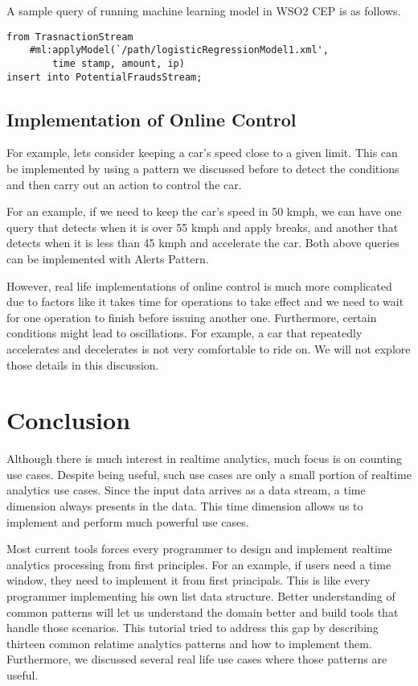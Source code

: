 \documentclass{sig-alternate}
\begin{document}
{A sample query of running machine learning model in WSO2 CEP is as follows.


\begin{lstlisting}[mathescape, showstringspaces=false]
from TrasnactionStream
	#ml:applyModel(`/path/logisticRegressionModel1.xml',  
		time stamp, amount, ip) 
insert into PotentialFraudsStream;
\end{lstlisting} 

\subsection{Implementation of Online Control} 

For example, lets consider keeping a car's speed close to a given limit. This can be implemented by using a pattern we discussed before to detect the conditions and then carry out an action to control the car. 

For an example, if we need to keep the car's speed in 50 kmph, we can have one query that detects when it is over 55 kmph and apply breaks, and another that detects when it is less than 45 kmph and accelerate the car. Both above queries can be implemented with Alerts Pattern. 

However, real life implementations of online control is much more complicated due to factors like it takes time for operations to take effect and we need to wait for one operation to finish before issuing another one. Furthermore, certain conditions might lead to oscillations. For example, a car that repeatedly accelerates and decelerates is not very comfortable to ride on. We will not explore those details in this discussion. 

\section{Conclusion} 

Although there is much interest in realtime analytics, much focus is on counting use cases. Despite being useful, such use cases are only a small portion of realtime analytics use cases. Since the input data arrives as a data stream, a time dimension always presents in the data. This time dimension allows us to implement and perform much powerful use cases.  

Most current tools forces every programmer to design and implement realtime analytics processing from first principles. For an example, if users need a time window, they need to implement it from first principals.  This is like every programmer implementing his own list data structure. Better understanding of common patterns will let us understand the domain better and build tools that handle those scenarios. This tutorial tried to address this gap by describing thirteen common relatime analytics patterns and how to implement them. Furthermore, we discussed several real life use cases where those patterns are useful.


}
\end{document}
